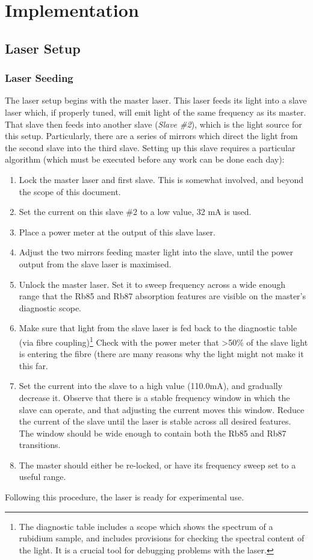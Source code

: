 \newpage
\section{Implementation}
\label{sec:implementation}

\subsection{Laser Setup}

    \subsubsection{Laser Seeding}

The laser setup begins with the master laser.  This laser feeds its light into a slave laser which, if properly tuned, will emit light of the same frequency as its master. That slave then feeds into another slave (\emph{Slave \#2}), which is the light source for this setup.  Particularly, there are a series of mirrors which direct the light from the second slave into the third slave.  Setting up this slave requires a particular algorithm (which must be executed before any work can be done each day):
\begin{enumerate}
 \item Lock the master laser and first slave.  This is somewhat involved, and beyond the scope of this document.
 \item Set the current on this slave \#2 to a low value, 32 mA is used.
 \item Place a power meter at the output of this slave laser.
 \item Adjust the two mirrors feeding master light into the slave, until the power output from the slave laser is maximised.
 \item Unlock the master laser.  Set it to sweep frequency across a wide enough range that the Rb85 and Rb87 absorption features are visible on the master's diagnostic scope.
 \item Make sure that light from the slave laser is fed back to the diagnostic table (via fibre coupling)\footnote{The diagnostic table includes a scope which shows the spectrum of a rubidium sample, and includes provisions for checking the spectral content of the light.  It is a crucial tool for debugging problems with the laser.}  Check with the power meter that >50\% of the slave light is entering the fibre (there are many reasons why the light might not make it this far.
 \item Set the current into the slave to a high value (110.0mA), and gradually decrease it.  Observe that there is a stable frequency window in which the slave can operate, and that adjusting the current moves this window.  Reduce the current of the slave until the laser is stable across all desired features.  The window should be wide enough to contain both the Rb85 and Rb87 transitions.
 \item The master should either be re-locked, or have its frequency sweep set to a useful range.
\end{enumerate}
Following this procedure, the laser is ready for experimental use.


